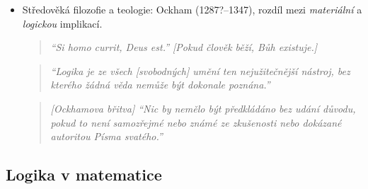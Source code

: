 \begin{itemize}
\item Středověká filozofie a teologie: Ockham (1287?--1347), rozdíl mezi \emph{materiální} a \emph{logickou} implikací.
    
        \begin{quote}\it
            ``Si homo currit, Deus est.'' [Pokud člověk běží, Bůh existuje.]
        \end{quote}

        \begin{quote}\it
            ``Logika je ze všech [svobodných] umění ten nejužitečnější nástroj, bez kterého žádná věda nemůže být dokonale poznána.''
        \end{quote}

        \begin{quote}\it
            [Ockhamova břitva] ``Nic by nemělo být předkládáno bez udání důvodu, pokud to není samozřejmé nebo známé ze zkušenosti nebo dokázané autoritou Písma svatého.'' 
        \end{quote}

\end{itemize}


\subsection*{Logika v matematice}


